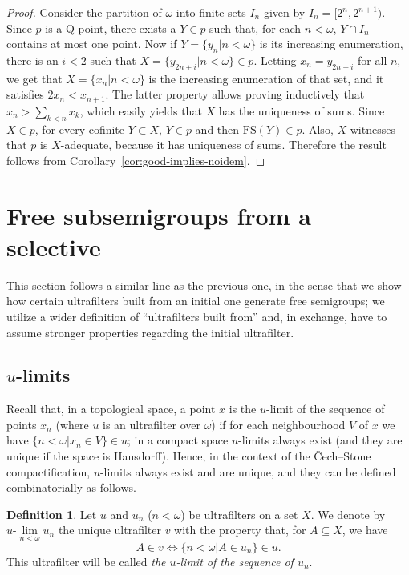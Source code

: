 \documentclass[10pt]{amsart}
\newcommand{\ulim}[2]{#1\text{-}\lim\limits_{#2<\omega}}
\theoremstyle{definition}
\newtheorem{definition}[theorem]{Definition}
\theoremstyle{remark}
\begin{document}
\begin{proof}
    Consider the partition of $\omega$ into finite sets $I_n$ given by $I_n=[2^n,2^{n+1})$. Since $p$ is a Q-point, there exists a $Y\in p$ such that, for each $n<\omega$, $Y\cap I_n$ contains at most one point. Now if $Y=\{y_n\big|n<\omega\}$ is its increasing enumeration, there is an $i<2$ such that $X=\{y_{2n+i}\big|n<\omega\}\in p$. Letting $x_n=y_{2n+i}$ for all $n$, we get that $X=\{x_n\big|n<\omega\}$ is the increasing enumeration of that set, and it satisfies $2x_n<x_{n+1}$. The latter property allows proving inductively that $x_n>\sum_{k<n}x_k$, which easily yields that $X$ has the uniqueness of sums. Since $X\in p$, for every cofinite $Y\subset X$, $Y\in p$ and then $\text{FS}(Y)\in p$. Also, $X$ witnesses that $p$ is $X$-adequate, because it has uniqueness of sums.  Therefore the result follows from Corollary~\ref{cor:good-implies-noidem}.
\end{proof}
   
\section{Free subsemigroups from a selective}

This section follows a similar line as the previous one, in the sense that we show how certain ultrafilters built from an initial one generate free semigroups; we utilize a wider definition of ``ultrafilters built from'' and, in exchange, have to assume stronger properties regarding the initial ultrafilter.

\subsection{$u$-limits}

Recall that, in a topological space, a point $x$ is the $u$-limit of the sequence of points $x_n$ (where $u$ is an ultrafilter over $\omega$) if for each neighbourhood $V$ of $x$ we have $\{n<\omega\big|x_n\in V\}\in u$; in a compact space $u$-limits always exist (and they are unique if the space is Hausdorff). Hence, in the context of the \v{Cech}--Stone compactification, $u$-limits always exist and are unique, and they can be defined combinatorially as follows.

\begin{definition}\label{def:ulim}
Let $u$ and $u_n$ ($n<\omega$) be ultrafilters on a set $X$. We denote by $\ulim{u}{n}u_n$ the unique ultrafilter $v$ with the property that, for $A\subseteq X$, we have
\begin{equation*}
    A\in v\iff\{n<\omega\big|A\in u_n\}\in u.
\end{equation*}
This ultrafilter will be called {\em the $u$-limit of the sequence of $u_n$}.
\end{definition}
\end{document}
